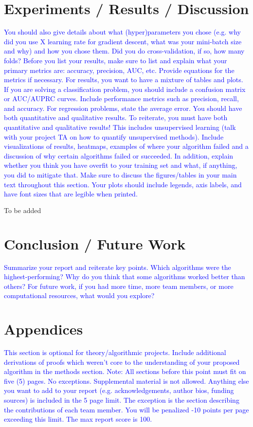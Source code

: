 \documentclass{article}
\newcommand{\note}[1]{\textcolor{blue}{{#1}}}
\begin{document}
\section{Experiments / Results / Discussion}
\note{%
You should also give details about what (hyper)parameters you chose (e.g. why did you use X learning rate for gradient descent, what was your mini-batch size and why) and how you chose them. Did you do cross-validation, if so, how many folds? Before you list your results, make sure to list and explain what your primary metrics are: accuracy, precision, AUC, etc. Provide equations for the metrics if necessary. For results, you want to have a mixture of tables and plots. If you are solving a classification problem, you should include a confusion matrix or AUC/AUPRC curves. Include performance metrics such as precision, recall, and accuracy. For regression problems, state the average error. You should have both quantitative and qualitative results. To reiterate, you must have both quantitative and qualitative results! This includes unsupervised learning (talk with your project TA on how to quantify unsupervised methods). Include visualizations of results, heatmaps, examples of where your algorithm failed and a discussion of why certain algorithms failed or succeeded. In addition, explain whether you think you have overfit to your training set and what, if anything, you did to mitigate that. Make sure to discuss the figures/tables in your main text throughout this section. Your plots should include legends, axis labels, and have font sizes that are legible when printed.
}

To be added


\section{Conclusion / Future Work}
\note{%
Summarize your report and reiterate key points. Which algorithms were the highest-performing? Why do you think that some algorithms worked better than others? For future work, if you had more time, more team members, or more computational resources, what would you explore?
}

\section{Appendices}
\note{%
This section is optional for theory/algorithmic projects. Include additional derivations of proofs which weren’t core to the understanding of your proposed algorithm in the methods section.
Note: All sections before this point must fit on five (5) pages. No exceptions. Supplemental material is not allowed. Anything else you want to add to your report (e.g. acknowledgements, author bios, funding sources) is included in the 5 page limit. The exception is the section describing the contributions of each team member. You will be penalized -10 points per page exceeding this limit. The max report score is 100.
}
\end{document}
